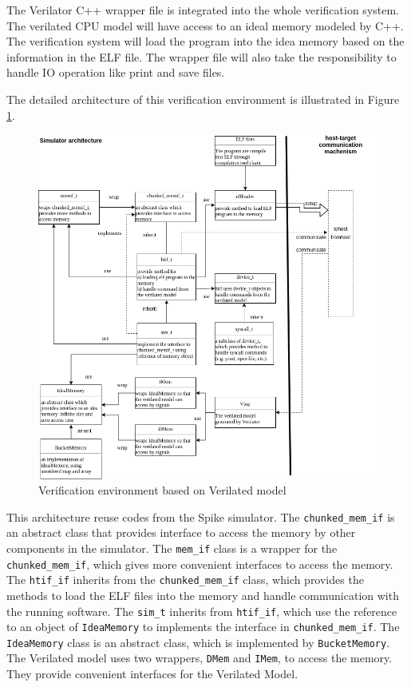 The Verilator C++ wrapper file is integrated into the whole verification system. The verilated CPU model will have access to an ideal memory modeled by C++. The verification system will load the program into the idea memory based on the information in the ELF file. The wrapper file will also take the responsibility to handle IO operation like print and save files.

The detailed architecture of this verification environment is illustrated in Figure \ref{fig:ve-vm}. 

\begin{figure}[!htp]
    \centering
    \includegraphics[width=\textwidth]{figure/simulator-archiecture.png}
    \caption{Verification environment based on Verilated model}
    \label{fig:ve-vm}
\end{figure}

This architecture reuse codes from the Spike simulator. The \texttt{chunked\_mem\_if} is an abstract class that provides interface to access the memory by other components in the simulator. The \texttt{mem\_if} class is a wrapper for the \texttt{chunked\_mem\_if}, which gives more convenient interfaces to access the memory. The \texttt{htif\_if} inherits from the \texttt{chunked\_mem\_if} class, which provides the methods to load the ELF files into the memory and handle communication with the running software. The \texttt{sim\_t} inherits from \texttt{htif\_if}, which use the reference to an object of \texttt{IdeaMemory} to implements the interface in \texttt{chunked\_mem\_if}. The \texttt{IdeaMemory} class is an abstract class, which is implemented by \texttt{BucketMemory}. The Verilated model uses two wrappers, \texttt{DMem} and \texttt{IMem}, to access the memory. They provide convenient interfaces for the Verilated Model. 

